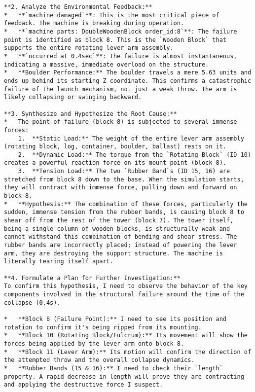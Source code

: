 \begin{lstlisting}
**2. Analyze the Environmental Feedback:**
*   **`machine damaged`**: This is the most critical piece of feedback. The machine is breaking during operation.
*   **`machine parts: DoubleWoodenBlock order_id:8`**: The failure point is identified as block 8. This is the `Wooden Block` that supports the entire rotating lever arm assembly.
*   **`occurred at 0.4sec`**: The failure is almost instantaneous, indicating a massive, immediate overload on the structure.
*   **Boulder Performance:** The boulder travels a mere 5.63 units and ends up behind its starting Z coordinate. This confirms a catastrophic failure of the launch mechanism, not just a weak throw. The arm is likely collapsing or swinging backward.

**3. Synthesize and Hypothesize the Root Cause:**
*   The point of failure (block 8) is subjected to several immense forces:
    1.  **Static Load:** The weight of the entire lever arm assembly (rotating block, log, container, boulder, ballast) rests on it.
    2.  **Dynamic Load:** The torque from the `Rotating Block` (ID 10) creates a powerful reaction force on its mount point (block 8).
    3.  **Tension Load:** The two `Rubber Band`s (ID 15, 16) are stretched from block 8 down to the base. When the simulation starts, they will contract with immense force, pulling down and forward on block 8.
*   **Hypothesis:** The combination of these forces, particularly the sudden, immense tension from the rubber bands, is causing block 8 to shear off from the rest of the tower (block 7). The tower itself, being a single column of wooden blocks, is structurally weak and cannot withstand this combination of bending and shear stress. The rubber bands are incorrectly placed; instead of powering the lever arm, they are destroying the support structure. The machine is literally tearing itself apart.

**4. Formulate a Plan for Further Investigation:**
To confirm this hypothesis, I need to observe the behavior of the key components involved in the structural failure around the time of the collapse (0.4s).

*   **Block 8 (Failure Point):** I need to see its position and rotation to confirm it's being ripped from its mounting.
*   **Block 10 (Rotating Block/Fulcrum):** Its movement will show the forces being applied by the lever arm onto block 8.
*   **Block 11 (Lever Arm):** Its motion will confirm the direction of the attempted throw and the overall collapse dynamics.
*   **Rubber Bands (15 & 16):** I need to check their `length` property. A rapid decrease in length will prove they are contracting and applying the destructive force I suspect.


\end{lstlisting}
